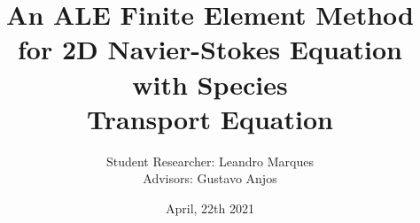 

\usepackage[T1]{fontenc} %
\usepackage[utf8]{inputenc} %
\usepackage[portuguese]{babel} %
\usepackage{cite} %
\usepackage{epsf,epsfig,psfig} %
\usepackage{fancyhdr} %
\usepackage{setspace} %
\usepackage{float} %
\usepackage{makeidx} %
\usepackage{amsmath,amssymb,bm,amsbsy} %
\usepackage{mathtools} %
\usepackage{lipsum} %
\usepackage{tikz,tikz-3dplot,pgfplots}
\usetikzlibrary{shapes.geometric}
\usetikzlibrary{patterns}
\usepackage{relsize}
\usetikzlibrary{shapes,arrows,arrows.meta,matrix}
\usepackage{ragged2e}

\justifying \title[]{An ALE Finite Element Method for 2D Navier-Stokes Equation with Species \\ Transport Equation}
\subtitle{}
\author{\vspace{0.5cm} Student Researcher: Leandro Marques \\ Advisors: Gustavo Anjos}

\date{April, 22th 2021}


\beamertemplatenavigationsymbolsempty 


